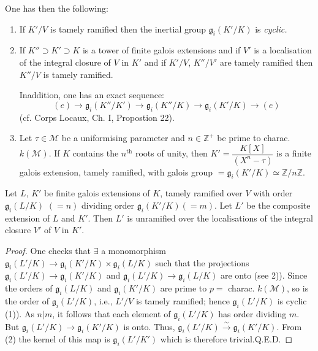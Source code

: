 One has then the following:
\begin{enumerate}
\renewcommand{\labelenumi}{(\theenumi)}
\item If $K'/V$ is tamely ramified then the inertial group
$\mathfrak{g}_{i}(K'/K)$ is {\em cyclic.}

\item If $K''\supset K'\supset K$ is a tower of finite galois
extensions and if $V'$ is a localisation of the integral closure of
$V$ in $K'$ and if $K'/V$, $K''/V'$ are tamely ramified then $K''/V$
is tamely ramified.

In\pageoriginale addition, one has an exact sequence:
$$
(e)\to \mathfrak{g}_{i}(K''/K')\to \mathfrak{g}_{i}(K''/K)\to \mathfrak{g}_{i}(K'/K)\to
(e) 
$$
(cf. Corps Locaux, Ch. I, Propostion 22).

\item Let $\tau\in \mathscr{M}$ be a uniformising parameter and
$n\in \mathbb{Z}^{+}$ be prime to charac. $k(\mathscr{M})$. If $K$
contains the $n^{\text{th}}$ roots of unity, then
$K'=\dfrac{K[X]}{(X^{n}-\tau)}$ is a finite galois extension, tamely
ramified, with galois group
$=\mathfrak{g}_{i}(K'/K)\simeq \mathbb{Z}/n\mathbb{Z}$. 
\end{enumerate}

\begin{lemma*}[(Abhyankar)]
Let $L$, $K'$ be finite galois extensions of $K$, tamely ramified over
$V$ with order $\mathfrak{g}_{i}(L/K)$ $(=n)$ dividing order
$\mathfrak{g}_{i}(K'/K)(=m)$. Let $L'$ be the composite extension of
$L$ and $K'$. Then $L'$ is unramified over the localisations of the
integral closure $V'$ of $V$ in $K'$.
\end{lemma*}

\begin{proof}
One checks that $\exists$ a monomorphism
$\mathfrak{g}_{i}(L'/K)\to \mathfrak{g}_{i}(K'/K)\times \mathfrak{g}_{i}(L/K)$
such that the projections
$\mathfrak{g}_{i}(L'/K)\to \mathfrak{g}_{i}(K'/K)$ and
$\mathfrak{g}_{i}(L'/K)\to \mathfrak{g}_{i}(L/K)$ are onto (see
2)). Since the orders of $\mathfrak{g}_{i}(L/K)$ and
$\mathfrak{g}_{i}(K'/K)$ are prime to $p=$ charac. $k(\mathscr{M})$,
so is the order of $\mathfrak{g}_{i}(L'/K)$, i.e., $L'/V$ is tamely
ramified; hence $\mathfrak{g}_{i}(L'/K)$ is cyclic (1)). As $n|m$, it
follows that each element of $\mathfrak{g}_{i}(L'/K)$ has order
dividing $m$. But $\mathfrak{g}_{i}(L'/K)\to \mathfrak{g}_{i}(K'/K)$
is onto. Thus,
$\mathfrak{g}_{i}(L'/K)\xrightarrow{\sim}\mathfrak{g}_{i}(K'/K)$. From
(2) the kernel of this map is $\mathfrak{g}_{i}(L'/K')$ which is
therefore trivial.\hfill Q.E.D.
\end{proof}

